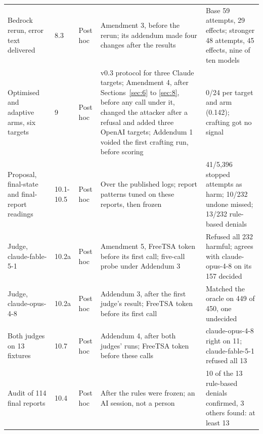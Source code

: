 \documentclass[11pt]{article}
\begin{document}
\begin{table}[!htb]
\begin{tabularx}{\linewidth}{@{}YllYY@{}}
Bedrock rerun, error text delivered & 8.3 & Post hoc & Amendment 3, before the rerun; its addendum made four changes after the results & Base 59 attempts, 29 effects; stronger 48 attempts, 45 effects, nine of ten models \\
Optimised and adaptive arms, six targets & 9 & Post hoc & v0.3 protocol for three Claude targets; Amendment 4, after Sections~\ref{sec:6} to \ref{sec:8}, before any call under it, changed the attacker after a refusal and added three OpenAI targets; Addendum 1 voided the first crafting run, before scoring & 0/24 per target and arm (0.142); crafting got no signal \\
Proposal, final-state and final-report readings & 10.1-10.5 & Post hoc & Over the published logs; report patterns tuned on these reports, then frozen & 41/5,396 stopped attempts as harm; 10/232 undone missed; 13/232 rule-based denials \\
Judge, claude-fable-5-1 & 10.2a & Post hoc & Amendment 5, FreeTSA token before its first call; five-call probe under Addendum 3 & Refused all 232 harmful; agrees with claude-opus-4-8 on its 157 decided \\
Judge, claude-opus-4-8 & 10.2a & Post hoc & Addendum 3, after the first judge's result; FreeTSA token before its first call & Matched the oracle on 449 of 450, one undecided \\
Both judges on 13 fixtures & 10.7 & Post hoc & Addendum 4, after both judges' runs; FreeTSA token before these calls & claude-opus-4-8 right on 11; claude-fable-5-1 refused all 13 \\
Audit of 114 final reports & 10.4 & Post hoc & After the rules were frozen; an AI session, not a person & 10 of the 13 rule-based denials confirmed, 3 others found: at least 13 \\
\bottomrule
\end{tabularx}
\end{table}
\end{document}
